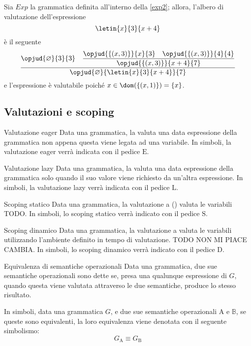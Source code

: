 \documentclass[a4paper, 12pt]{report}
\begin{document}
    \begin{example}
        Sia $Exp$ la grammatica definita all'interno della \cref{exp2}; allora, l'albero di valutazione dell'espressione $$\letin{x}{3}{x + 4}$$ è il seguente $$\dfrac{\opjud{\varnothing}{3}{3} \quad \dfrac{\opjud{\{(x, 3)\}}{x}{3} \quad \opjud{\{(x,3)\}}{4}{4}}{\opjud{\{(x, 3)\}}{x +4}{7}}}{\opjud{\varnothing}{\letin{x}{3}{x +4}}{7}}$$ e l'espressione è valutabile poiché $x \in \dom(\{(x,1)\}) = \{x\}$.
    \end{example}

    \subsection{Valutazioni e scoping}

    \begin{frameddefn}{Valutazione eager}
        Data una grammatica, la  valuta una data espressione della grammatica non appena questa viene legata ad una variabile. In simboli, la valutazione eager verrà indicata con il pedice $\mathrm{E}$.
    \end{frameddefn}

    \begin{frameddefn}{Valutazione lazy}
        Data una grammatica, la  valuta una data espressione della grammatica solo quando il suo valore viene richiesto da un'altra espressione. In simboli, la valutazione lazy verrà indicata con il pedice $\mathrm{L}$.
    \end{frameddefn}

    \begin{frameddefn}{Scoping statico}
        Data una grammatica, la valutazione a  () valuta le variabili TODO. In simboli, lo scoping statico verrà indicato con il pedice $\mathrm{S}$.
    \end{frameddefn}

    \begin{frameddefn}{Scoping dinamico}
        Data una grammatica, la valutazione a  valuta le variabili utilizzando l'ambiente definito in tempo di valutazione. TODO NON MI PIACE CAMBIA. In simboli, lo scoping dinamico verrà indicato con il pedice $\mathrm{D}$.
    \end{frameddefn}

    \begin{frameddefn}[label={equiv lang}]{Equivalenza di semantiche operazionali}
        Data una grammatica, due sue semantiche operazionali sono dette  se, presa una qualunque espressione di $G$, quando questa viene valutata attraverso le due semantiche, produce lo stesso risultato.

        In simboli, data una grammatica $G$, e due sue semantiche operazionali $\mathrm{A}$ e $\mathbb{B}$, se queste sono equivalenti, la loro equivalenza viene denotata con il seguente simbolismo: $$G_\mathrm{A} \equiv G_\mathrm{B}$$
    \end{frameddefn}
\end{document}
